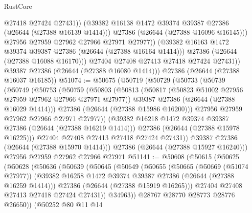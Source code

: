 \begin{lexlean}{RustCore}
\begin{coremodule}
                      @27418
                      @27424
                      @27431))
                  (@39382 @16138 @1472 @39374 @39387 @27386 (@26644 (@27388 @16139 @1414)))
                  @27386
                  (@26644 (@27388 @16096 @16145)))
                @27956
                @27959
                @27962
                @27966
                @27971
                @27977))
            (@39382 @16163 @1472 @39374 @39387 @27386 (@26644 (@27388 @16164 @1414)))
            @27386
            (@26644 (@27388 @16088 @16170)))
          @27404
          @27408
          @27413
          @27418
          @27424
          @27431))
      @39387
      @27386
      (@26644 (@27388 @16080 @1414)))
    @27386
    (@26644 (@27388 @16037 @16185))
@51074 := @50675
    (@50719
      (@50729
        (@50733
          (@50739
            (@50749
              (@50753
                (@50759
                  (@50803
                    (@50813
                      (@50817 (@50823 @51002 @27956 @27959 @27962 @27966 @27971 @27977))
                      @39387
                      @27386
                      (@26644 (@27388 @16029 @1414)))
                    @27386
                    (@26644 (@27388 @15986 @16200)))
                  @27956
                  @27959
                  @27962
                  @27966
                  @27971
                  @27977))
              (@39382 @16218 @1472 @39374 @39387 @27386 (@26644 (@27388 @16219 @1414)))
              @27386
              (@26644 (@27388 @15978 @16225)))
            @27404
            @27408
            @27413
            @27418
            @27424
            @27431))
        @39387
        @27386
        (@26644 (@27388 @15970 @1414)))
      @27386
      (@26644 (@27388 @15927 @16240)))
    @27956
    @27959
    @27962
    @27966
    @27971
@51141 := @50608
    (@50615
      (@50625
        (@50628
          (@50636
            (@50639
              (@50645
                (@50649
                  (@50655
                    (@50665
                      (@50669 (@51074 @27977))
                      (@39382 @16258 @1472 @39374 @39387 @27386 (@26644 (@27388 @16259 @1414)))
                      @27386
                      (@26644 (@27388 @15919 @16265)))
                    @27404
                    @27408
                    @27413
                    @27418
                    @27424
                    @27431))
                @34963))
            @28767
            @28770
            @28773
            @28776
            @26650))
        (@50252
          @80
          @11
          @14

\end{coremodule}
\end{lexlean}
